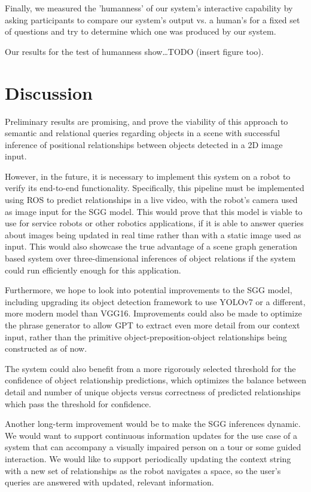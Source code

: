 \documentclass[letterpaper, 10 pt, conference]{ieeeconf}  %
\begin{document}
    Finally, we measured the 'humanness' of our system's interactive capability by asking participants to compare our system's output vs. a human's for a fixed set of questions and try to determine which one was produced by our system. 
    
    Our results for the test of humanness show\dots TODO (insert figure too).

\section{Discussion}
    Preliminary results are promising, and prove the viability of this approach to semantic and relational queries regarding objects in a scene with successful inference of positional relationships between objects detected in a 2D image input. 
    
    However, in the future, it is necessary to implement this system on a robot to verify its end-to-end functionality. Specifically, this pipeline must be implemented using ROS to predict relationships in a live video, with the robot's camera used as image input for the SGG model. This would prove that this model is viable to use for service robots or other robotics applications, if it is able to answer queries about images being updated in real time rather than with a static image used as input. This would also showcase the true advantage of a scene graph generation based system over three-dimensional inferences of object relations if the system could run efficiently enough for this application.

    Furthermore, we hope to look into potential improvements to the SGG model, including upgrading its object detection framework to use YOLOv7 or a different, more modern model than VGG16. Improvements could also be made to optimize the phrase generator to allow GPT to extract even more detail from our context input, rather than the primitive object-preposition-object relationships being constructed as of now. 
    
    The system could also benefit from a more rigorously selected threshold for the confidence of object relationship predictions, which optimizes the balance between detail and number of unique objects versus correctness of predicted relationships which pass the threshold for confidence.

    Another long-term improvement would be to make the SGG inferences dynamic. We would want to support continuous information updates for the use case of a system that can accompany a visually impaired person on a tour or some guided interaction. We would like to support periodically updating the context string with a new set of relationships as the robot navigates a space, so the user's queries are answered with updated, relevant information.
\end{document}
